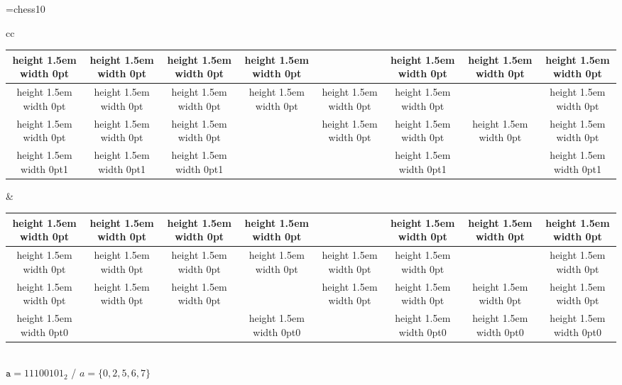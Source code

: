 \documentclass{article}
\begin{document}
\font\Chess=chess10
\newcommand{\qw}{\vrule height 1.5em width 0pt{\Chess Q}}
\newcommand{\qb}{\vrule height 1.5em width 0pt{\Chess q}}
\newcommand{\qr}{\vrule height 1.5em width 0pt{\color{red}\Chess q}}
\newcommand{\vide}{\vrule height 1.5em width 0pt\phantom{\Chess q}}
\newcommand{\one}{\vrule height 1.5em width 0pt{1}}
\newcommand{\zero}{\vrule height 1.5em width 0pt{0}}
\newcommand{\qm}{\vrule height 1.5em width 0pt\hfil?\hfil}
\newcommand{\ad}{\begin{turn}{45}\dots\end{turn}}
\newcommand{\dd}{$\ddots$}
\newcommand{\vd}{$\vdots$}


\begin{center}
\begin{tabular}{cc}
  \begin{tabular}{|c|c|c|c|c|c|c|c|}
    \hline
    \vide & \vide & \vide & \vide & \rnode{as}{\qb} & \vide & \vide & \vide \\\hline
    \vide & \vide & \vide & \vide & \vide & \vide & \rnode{cs}{\qb}   & \vide \\\hline
    \vide & \vide & \vide & \rnode{bs}{\qb}   & \vide & \vide & \vide   & \vide \\\hline
    \one  & \one  & \one  & \rnode{bd}{0}     & \rnode{ad}{0}     & \one  & \rnode{cd}{0}     & \one  \\\hline
  \end{tabular}

&

  \begin{tabular}{|c|c|c|c|c|c|c|c|}
    \hline
    \vide & \vide & \vide & \vide & \rnode{as}{\qb} & \vide & \vide & \vide \\\hline
    \vide & \vide & \vide & \vide & \vide & \vide & \rnode{cs}{\qb}   & \vide \\\hline
    \vide & \vide & \vide & \rnode{bs}{\qb}  & \vide & \vide & \vide & \vide \\\hline
    \zero & \rnode{ad}{1} & \rnode{bd}{1} & \zero & \rnode{cd}{1} & \zero & \zero & \zero \\\hline
  \end{tabular}

\\[4em]
  
$\mathtt{a} = 11100101_2$ / $a = \{0,2,5,6,7\}$


\end{tabular}
\end{center}
\end{document}
